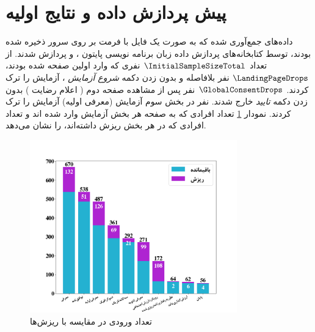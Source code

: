 \section{پیش پردازش داده و نتایج اولیه}
داده‌های جمع‌آوری شده که به صورت یک فایل با فرمت
بر روی سرور ذخیره شده بودند، توسط کتابخانه‌های پردازش داده زبان برنامه نویسی پایتون
\!،
و
پردازش شدند. از تعداد $\InitialSampleSizeTotal$
نفری که وارد اولین صفحه شده بودند،
$\LandingPageDrops$
نفر بلافاصله و بدون زدن دکمه
\textit{شروع آزمایش}
\!،
آزمایش را ترک کردند.
$\GlobalConsentDrops$
نفر پس از مشاهده صفحه دوم
\!(
اعلام رضایت
)
بدون زدن دکمه
\textit{تایید}
خارج شدند.
\otherPIIDisClosureDrops
نفر در بخش سوم آزمایش
\!(معرفی اولیه)
آزمایش را ترک کردند.
نمودار
\ref{fig:PageNotSubmitedDataFrame}
تعداد افرادی که به صفحه هر بخش آزمایش وارد شده اند و تعداد افرادی  که در هر بخش ریزش داشته‌اند، را نشان می‌دهد.
\begin{figure}[ht]
    \centerline{\includegraphics[width=0.8\textwidth]{./img/PageNotSubmitedDataFrame.png}}
    \caption{تعداد ورودی در مقایسه با ریزش‌ها}
    \label{fig:PageNotSubmitedDataFrame}
\end{figure}




% 

